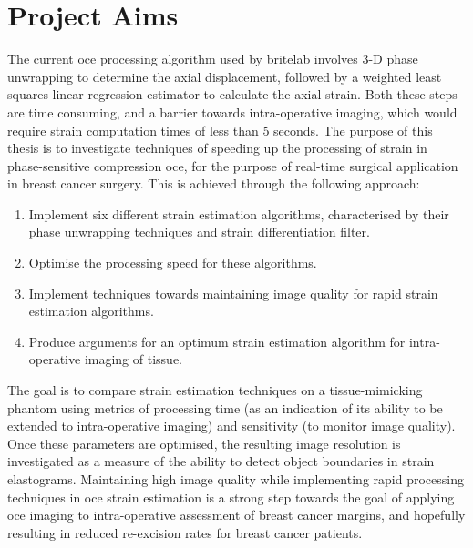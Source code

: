 \section{Project Aims}\label{aims}

The current \ac{oce} processing algorithm used by \ac{britelab} involves 3-D phase unwrapping to determine the axial displacement, followed by a weighted least squares linear regression estimator to calculate the axial strain. Both these steps are time consuming, and a barrier towards intra-operative imaging, which would require strain computation times of less than 5 seconds. The purpose of this thesis is to investigate techniques of speeding up the processing of strain in phase-sensitive compression \ac{oce}, for the purpose of real-time surgical application in breast cancer surgery. This is achieved through the following approach:
\begin{enumerate}
	\item Implement six different strain estimation algorithms, characterised by their phase unwrapping techniques and strain differentiation filter.
	\item Optimise the processing speed for these algorithms.
	\item Implement techniques towards maintaining image quality for rapid strain estimation algorithms.
	\item Produce arguments for an optimum strain estimation algorithm for intra-operative imaging of tissue.
\end{enumerate}
The goal is to compare strain estimation techniques on a tissue-mimicking phantom using metrics of processing time (as an indication of its ability to be extended to intra-operative imaging) and sensitivity (to monitor image quality). Once these parameters are optimised, the resulting image resolution is investigated as a measure of the ability to detect object boundaries in strain elastograms. Maintaining high image quality while implementing rapid processing techniques in \ac{oce} strain estimation is a strong step towards the goal of applying \ac{oce} imaging to intra-operative assessment of breast cancer margins, and hopefully resulting in reduced re-excision rates for breast cancer patients. 
